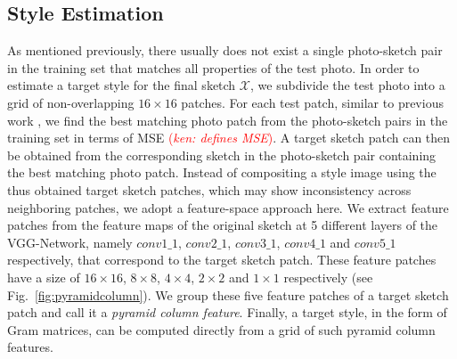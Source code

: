\documentclass[10pt,twocolumn,letterpaper]{article}
\newcommand\ken[1]{{\small \textcolor{red}{(\emph{ken: #1})}}}
\begin{document}
\subsection{Style Estimation} \label{subsec:pyramid_feature_column}
As mentioned previously, there usually does not exist a single photo-sketch pair in the training set that matches all properties of the test photo. In order to estimate a target style for the final sketch $\mathcal{X}$, we subdivide the test photo into a grid of non-overlapping $16\times16$ patches. For each test patch, similar to previous work  \cite{wang2009face,zhou2012markov}, we find the best matching photo patch from the photo-sketch pairs in the training set in terms of MSE \ken{defines MSE}. A target sketch patch can then be obtained from the corresponding sketch in the photo-sketch pair containing the best matching photo patch. Instead of compositing a style image using the thus obtained target sketch patches, which may show inconsistency across neighboring patches, we adopt a feature-space approach here. We extract feature patches from the feature maps of the original sketch at 5 different layers of the VGG-Network, namely $conv1\_1$, $conv2\_1$, $conv3\_1$, $conv4\_1$ and $conv5\_1$ respectively, that correspond to the target sketch patch. These feature patches have a size of $16\times16$, $8\times8$, $4\times4$, $2\times2$ and $1\times1$ respectively (see Fig.~\ref{fig:pyramidcolumn}). We group these five feature patches of a target sketch patch and call it a  {\em pyramid column feature}. Finally, a target style, in the form of Gram matrices, can be computed directly from a grid of such pyramid column features.

\end{document}
